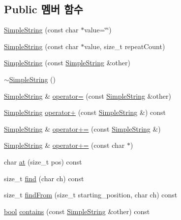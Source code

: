 \subsection*{Public 멤버 함수}
\begin{DoxyCompactItemize}
\item 
\hyperlink{class_simple_string_a9fa666fba36cf703959cd0e92474b44b}{Simple\+String} (const char $\ast$value=\char`\"{}\char`\"{})
\item 
\hyperlink{class_simple_string_a62284d0427155cd5f30458045f7922de}{Simple\+String} (const char $\ast$value, size\+\_\+t repeat\+Count)
\item 
\hyperlink{class_simple_string_aa03b0bec899eacad700eff61b8d3fbd7}{Simple\+String} (const \hyperlink{class_simple_string}{Simple\+String} \&other)
\item 
\hyperlink{class_simple_string_ac34b8e263c7d4be83d45231b0c3c9216}{$\sim$\+Simple\+String} ()
\item 
\hyperlink{class_simple_string}{Simple\+String} \& \hyperlink{class_simple_string_aae90a6ffdaf41b741c4c69bc0a15739f}{operator=} (const \hyperlink{class_simple_string}{Simple\+String} \&other)
\item 
\hyperlink{class_simple_string}{Simple\+String} \hyperlink{class_simple_string_a14dc1e93b7e555260aa666ef71d0ab55}{operator+} (const \hyperlink{class_simple_string}{Simple\+String} \&) const 
\item 
\hyperlink{class_simple_string}{Simple\+String} \& \hyperlink{class_simple_string_acef3905e386861afd5e2922efac8072d}{operator+=} (const \hyperlink{class_simple_string}{Simple\+String} \&)
\item 
\hyperlink{class_simple_string}{Simple\+String} \& \hyperlink{class_simple_string_ad5c143e8b843ff1620ae54fd74b66a87}{operator+=} (const char $\ast$)
\item 
char \hyperlink{class_simple_string_abe3ea87f6889a99798118823611455c6}{at} (size\+\_\+t pos) const 
\item 
size\+\_\+t \hyperlink{class_simple_string_a3a6cc75db9d8da03b923480134786898}{find} (char ch) const 
\item 
size\+\_\+t \hyperlink{class_simple_string_a25e9616438515cde9b5a21f48cb8b65a}{find\+From} (size\+\_\+t starting\+\_\+position, char ch) const 
\item 
\hyperlink{avb__gptp_8h_af6a258d8f3ee5206d682d799316314b1}{bool} \hyperlink{class_simple_string_abdbf6fb985e8643e24d7035e830b7b00}{contains} (const \hyperlink{class_simple_string}{Simple\+String} \&other) const 
\item 

\end{DoxyCompactItemize}

